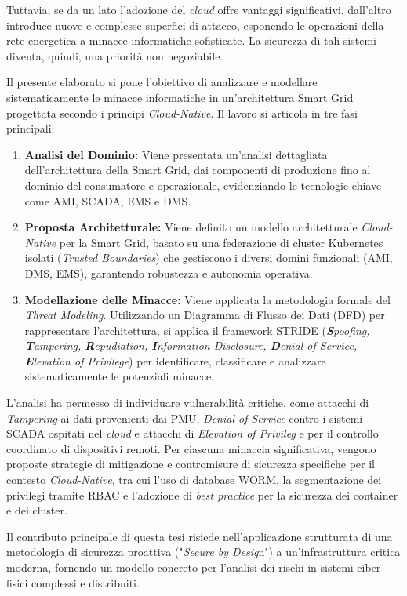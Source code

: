 Tuttavia, se da un lato l'adozione del \textit{cloud} offre vantaggi significativi, dall'altro introduce nuove e complesse superfici di attacco, esponendo le operazioni della rete energetica a minacce informatiche sofisticate. La sicurezza di tali sistemi diventa, quindi, una priorità non negoziabile.



Il presente elaborato si pone l'obiettivo di analizzare e modellare sistematicamente le minacce informatiche in un'architettura Smart Grid progettata secondo i principi \textit{Cloud-Native}. Il lavoro si articola in tre fasi principali:


\begin{enumerate}
    \item \textbf{Analisi del Dominio:} Viene presentata un'analisi dettagliata dell'architettura della Smart Grid, dai componenti di produzione fino al dominio del consumatore e operazionale, evidenziando le tecnologie chiave come AMI, SCADA, EMS e DMS.
    \item \textbf{Proposta Architetturale:} Viene definito un modello architetturale \textit{Cloud-Native} per la Smart Grid, basato su una federazione di cluster Kubernetes isolati (\textit{Trusted Boundaries}) che gestiscono i diversi domini funzionali (AMI, DMS, EMS), garantendo robustezza e autonomia operativa.
    \item \textbf{Modellazione delle Minacce:} Viene applicata la metodologia formale del \textit{Threat Modeling}. Utilizzando un Diagramma di Flusso dei Dati (DFD) per rappresentare l'architettura, si applica il framework STRIDE (\textit{\textbf{S}poofing, \textbf{T}ampering, \textbf{R}epudiation, \textbf{I}nformation Disclosure, \textbf{D}enial of Service, \textbf{E}levation of Privilege}) per identificare, classificare e analizzare sistematicamente le potenziali minacce.
\end{enumerate}



L'analisi ha permesso di individuare vulnerabilità critiche, come attacchi di \textit{Tampering} ai dati provenienti dai PMU, \textit{Denial of Service} contro i sistemi SCADA ospitati nel \textit{cloud} e attacchi di \textit{Elevation of Privileg} e per il controllo coordinato di dispositivi remoti. Per ciascuna minaccia significativa, vengono proposte strategie di mitigazione e contromisure di sicurezza specifiche per il contesto \textit{Cloud-Native}, tra cui l'uso di database WORM, la segmentazione dei privilegi tramite RBAC e l'adozione di \textit{best practice} per la sicurezza dei container e dei cluster.


Il contributo principale di questa tesi risiede nell'applicazione strutturata di una metodologia di sicurezza proattiva ("\textit{Secure by Desig}n") a un'infrastruttura critica moderna, fornendo un modello concreto per l'analisi dei rischi in sistemi ciber-fisici complessi e distribuiti.
